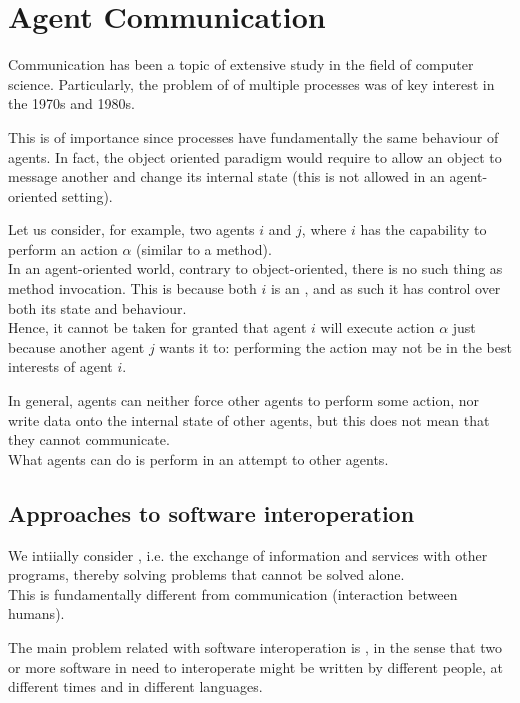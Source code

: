 \chapter{Agent Communication}
\label{ch:AgentCommunication}

\minitoc

Communication has been a topic of extensive study in the field of computer science. Particularly, the problem of  of multiple processes was of key interest in the 1970s and 1980s.

This is of importance since processes have fundamentally the same behaviour of agents. In fact, the object oriented paradigm would require  to allow an object to message another and change its internal state (this is not allowed in an agent-oriented setting).

Let us consider, for example, two agents $i$ and $j$, where $i$ has the capability to perform an action $\alpha$ (similar to a method).\\
In an agent-oriented world, contrary to object-oriented, there is no such thing as method invocation. This is because both $i$ is an , and as such it has control over both its state and behaviour.\\
Hence, it cannot be taken for granted that agent $i$ will execute action $\alpha$ just because another agent $j$ wants it to: performing the action may not be in the best interests of agent $i$.

In general, agents can neither force other agents to perform some action, nor write data onto the internal state of other agents, but this does not mean that they cannot communicate.\\
What agents can do is perform  in an attempt to  other agents.

\section{Approaches to software interoperation}
We intiially consider , i.e. the exchange of information and services with other programs, thereby solving problems that cannot be solved alone.\\
This is fundamentally different from communication (interaction between humans).

The main problem related with software interoperation is , in the sense that two or more software in need to interoperate might be written by different people, at different times and in different languages.

